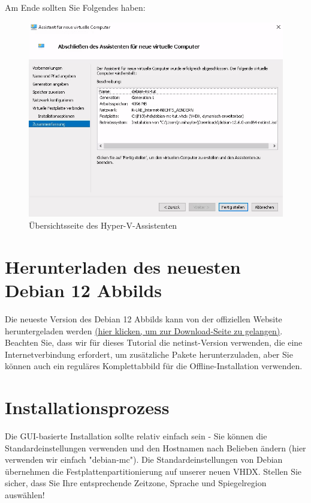 \documentclass[]{article}
\begin{document}
Am Ende sollten Sie Folgendes haben:

\begin{figure}[h]
    \caption{Übersichtsseite des Hyper-V-Assistenten}
    \centering
    \includegraphics[width=1\textwidth]{vm-config}
\end{figure}
\FloatBarrier

\section{Herunterladen des neuesten Debian 12 Abbilds}

Die neueste Version des Debian 12 Abbilds kann von der offiziellen Website heruntergeladen werden \href{https://www.debian.org/download}{(hier klicken, um zur Download-Seite zu gelangen)}. Beachten Sie, dass wir für dieses Tutorial die netinst-Version verwenden, die eine Internetverbindung erfordert, um zusätzliche Pakete herunterzuladen, aber Sie können auch ein reguläres Komplettabbild für die Offline-Installation verwenden.

\section{Installationsprozess}

Die GUI-basierte Installation sollte relativ einfach sein - Sie können die Standardeinstellungen verwenden und den Hostnamen nach Belieben ändern (hier verwenden wir einfach "debian-mc"). Die Standardeinstellungen von Debian übernehmen die Festplattenpartitionierung auf unserer neuen VHDX. Stellen Sie sicher, dass Sie Ihre entsprechende Zeitzone, Sprache und Spiegelregion auswählen!
\end{document}
